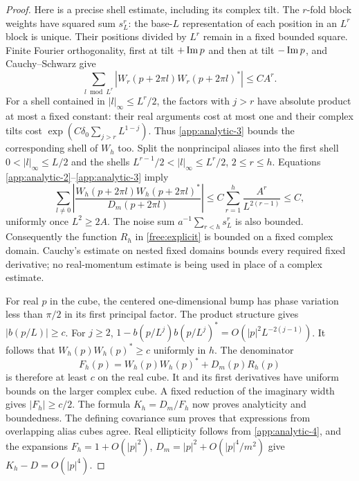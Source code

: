 \begin{proof}
Here is a precise shell estimate, including its complex tilt.  The
$r$-fold block weights have squared sum $s_L^r$: the base-$L$
representation of each position in an $L^r$ block is unique.  Their
positions divided by $L^r$ remain in a fixed bounded square.  Finite
Fourier orthogonality, first at tilt $+\mathop{\rm Im}p$ and then at
tilt $-\mathop{\rm Im}p$, and Cauchy--Schwarz give
\begin{equation}
 \sum_{l\bmod L^r}
 |W_r(p+2\pi l)W_r(p+2\pi l)^*|\le C A^r.             \label{app:analytic-3}
\end{equation}
For a shell contained in $|l|_\infty\le L^r/2$, the factors with
$j>r$ have absolute product at most a fixed constant: their real
arguments cost at most one and their complex tilts cost
$\exp(C\delta_0\sum_{j>r}L^{1-j})$.  Thus \eqref{app:analytic-3} bounds the
corresponding shell of $W_h$ too.  Split the nonprincipal aliases
into the first shell $0<|l|_\infty\le L/2$ and the shells
$L^{r-1}/2<|l|_\infty\le L^r/2$, $2\le r\le h$.
Equations \eqref{app:analytic-2}--\eqref{app:analytic-3} imply
\begin{equation}
 \sum_{l\ne0}
 \left|\frac{W_h(p+2\pi l)W_h(p+2\pi l)^*}
 {D_m(p+2\pi l)}\right|
 \le C\sum_{r=1}^h\frac{A^r}{L^{2(r-1)}}\le C,        \label{app:analytic-4}
\end{equation}
uniformly once $L^2\ge2A$.  The noise sum
$a^{-1}\sum_{r<h}s_L^r$ is also bounded.  Consequently the function
$R_h$ in \eqref{free:explicit} is bounded on a fixed complex domain.
Cauchy's estimate on nested fixed domains bounds every required fixed
derivative; no real-momentum estimate is being used in place of a
complex estimate.

For real $p$ in the cube, the centered one-dimensional bump has phase
variation less than $\pi/2$ in its first principal factor.  The
product structure gives $|b(p/L)|\ge c$.
For $j\ge2$,
$1-b(p/L^j)b(p/L^j)^*=O(|p|^2L^{-2(j-1)})$.
It follows that $W_h(p)W_h(p)^*\ge c$ uniformly in $h$.
The denominator
\[
 F_h(p)=W_h(p)W_h(p)^*+D_m(p)R_h(p)
\]
is therefore at least $c$ on the real cube.  It and its first
derivatives have uniform bounds on the larger complex cube.  A
fixed reduction of the imaginary width gives $|F_h|\ge c/2$.
The formula $K_h=D_m/F_h$ now proves analyticity and boundedness.
The defining covariance sum proves that expressions from overlapping
alias cubes agree.  Real ellipticity follows from \eqref{app:analytic-4}, and the
expansions $F_h=1+O(|p|^2)$,
$D_m=|p|^2+O(|p|^4/m^2)$ give $K_h-D=O(|p|^4)$.


\end{proof}
